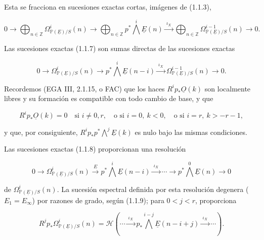 Esta se fracciona en sucesiones exactas cortas, imágenes de (1.1.3),

\begin{equation}\tag{1.1.7}
0\longrightarrow
\bigoplus_{n\in\mathbb Z}\Omega^i_{\mathbb P(\underline E)/S}(n)
\longrightarrow
\bigoplus_{n\in\mathbb Z}p^*\bigwedge^i\underline E(n)
\xrightarrow{\ \iota_X\ }
\bigoplus_{n\in\mathbb Z}\Omega^{i-1}_{\mathbb P(\underline E)/S}(n)
\longrightarrow0.
\end{equation}

Las sucesiones exactas (1.1.7) son sumas directas de las sucesiones exactas

\begin{equation}\tag{1.1.8}
0\longrightarrow\Omega^i_{\mathbb P(\underline E)/S}(n)
\longrightarrow p^*\bigwedge^i\underline E(n-i)
\xrightarrow{\ \iota_X\ }
\Omega^{i-1}_{\mathbb P(\underline E)/S}(n)
\longrightarrow0.
\end{equation}

Recordemos (EGA III, 2.1.15, o FAC) que los haces
$R^ip_*\underline O(k)$ son localmente libres y su formación es compatible
con todo cambio de base, y que

\begin{equation}\tag{1.1.9}
R^ip_*\underline O(k)=0
\quad\text{si }i\ne0,r,
\quad\text{o si }i=0,\ k<0,
\quad\text{o si }i=r,\ k>-r-1,
\end{equation}

y que, por consiguiente, $R^ip_*p^*\bigwedge^j\underline E(k)$ es nulo bajo
las mismas condiciones.

Las sucesiones exactas (1.1.8) proporcionan una resolución

\begin{equation}\tag{1.1.10}
0\longrightarrow\Omega^i_{\mathbb P(\underline E)/S}(n)
\xrightarrow{\ E\ }p^*\bigwedge^i\underline E(n-i)
\xrightarrow{\ \iota_X\ }\cdots\longrightarrow
p^*\bigwedge^0\underline E(n)\longrightarrow0
\end{equation}

de $\Omega^i_{\mathbb P(\underline E)/S}(n)$. La sucesión espectral
definida por esta resolución degenera ($E_1=E_\infty$) por razones de grado,
según (1.1.9); para $0<j<r$, proporciona

\begin{equation}\tag{1.1.11}
R^jp_*\Omega^i_{\mathbb P(\underline E)/S}(n)
=\mathcal H\left(\cdots\xrightarrow{\ \iota_X\ }
p_*\bigwedge^{i-j}\underline E(n-i+j)
\xrightarrow{\ \iota_X\ }\cdots\right).
\end{equation}

